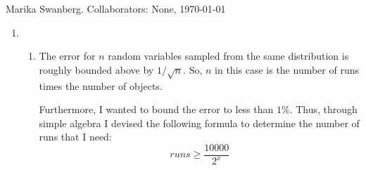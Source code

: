\documentclass[12pt]{article}
\author{Marika Swanberg}
\begin{document}
Marika Swanberg. Collaborators: None, \today
\bigskip 

\begin{enumerate}
\item 
\begin{enumerate}
\item The error for $n$ random variables sampled from the same distribution is roughly bounded above by $1/\sqrt{n}$. So, $n$ in this case is the number of runs times the number of objects.

Furthermore, I wanted to bound the error to less than $1\%$. Thus, through simple algebra I devised the following formula to determine the number of runs that I need: 
\begin{equation}
runs \geq \frac{10000}{2^x}
\end{equation}
\end{enumerate}
\end{enumerate}
\end{document}
